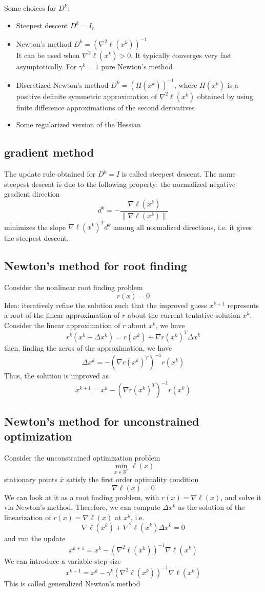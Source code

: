 \documentclass{book}
\newcommand{\R}{\mathbb{R}}
\theoremstyle{definition}
\theoremstyle{remark}
\theoremstyle{remark}
\begin{document}
Some choices for $D^k$:
\begin{itemize}
    \item Steepest descent $D^k=I_n$
    \item Newton's method $D^k = (\nabla^2\ell(x^k))^{-1}$\\
        It can be used when $\nabla^2\ell(x^k)>0$. It typically converges very fast asymptotically. For $\gamma^k = 1$ pure Newton's method
    \item Discretized Newton's method $D^k=(H(x^k))^{-1}$, where $H(x^k)$ is a positive definite symmetric approximation of $\nabla^2\ell(x^k)$ obtained by using finite difference approximations of the second derivatives 
    \item Some regularized version of the Hessian
\end{itemize}
\subsection{gradient method}
The update rule obtained for $D^k=I$ is called steepest descent. The name steepest descent is due to the following property: the normalized negative gradient direction 
\[
    d^k = -\displaystyle\frac{\nabla\ell(x^k)}{\|\nabla\ell(x^k)\|}
\]
minimizes the slope $\nabla \ell(x^k)^Td^k$ among all normalized directions, i.e. it gives the steepest descent.

\subsection{Newton's method for root finding}
Consider the nonlinear root finding problem 
\[
    r(x) = 0
\]
Idea: iteratively refine the solution such that the improved guess $x^{k+1}$ represents a root of the linear approximation of $r$ about the current tentative solution $x^k$. Consider the linear approximation of $r$ about $x^k$, we have 
\[
    r^k(x^k+\Delta x^k) = r(x^k)+\nabla r(x^k)^T\Delta x^k
\]
then, finding the zeros of the approximation, we have
\[
    \Delta x^k = -(\nabla r(x^k)^T)^{-1}r(x^k)
\]
Thus, the solution is improved as 
\[
    x^{k+1} = x^k-(\nabla r(x^k)^T)^{-1}r(x^k)
\]
\subsection{Newton's method for unconstrained optimization}
Consider the unconstrained optimization problem 
\[
    \min_{x\in\R^n} \ell(x)
\]
stationary points $\bar{x}$ satisfy the first order optimality condition 
\[
    \nabla \ell (\bar{x}) = 0
\]
We can look at it as a root finding problem, with $r(x)=\nabla\ell(x)$, and solve it via Newton's method. Therefore, we can compute $\Delta x^k$ as the solution of the linearization of $r(x)=\nabla\ell(x)$ at $x^k$, i.e. 
\[
    \nabla \ell(x^k) + \nabla^2\ell(x^k)\Delta x^k = 0
\]
and run the update 
\[
    x^{k+1} = x^k -(\nabla^2\ell(x^k))^{-1}\nabla\ell(x^k)
\]
We can introduce a variable step-size 
\[
    x^{k+1} = x^k-\gamma^k(\nabla^2\ell(x^k))^{-1}\nabla\ell(x^k)
\]
This is called generalized Newton's method
\end{document}
